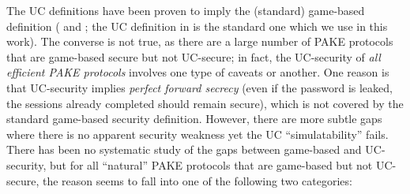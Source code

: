 The UC definitions have been proven to imply the (standard) game-based definition (\cite[Appendix~A]{EC:CHKLM05} and \cite[Section~5]{C:ABBJKX20}; the UC definition in \cite{EC:CHKLM05} is the standard one which we use in this work). The converse is not true, as there are a large number of PAKE protocols that are game-based secure but not UC-secure; in fact, the UC-security of \emph{all efficient PAKE protocols} involves one type of caveats or another. One reason is that UC-security implies \emph{perfect forward secrecy} (even if the password is leaked, the sessions already completed should remain secure), which is not covered by the standard game-based security definition. However, there are more subtle gaps where there is no apparent security weakness yet the UC ``simulatability'' fails. There has been no systematic study of the gaps between game-based and UC-security, but for all ``natural'' PAKE protocols that are game-based but not UC-secure, the reason seems to fall into one of the following two categories:
